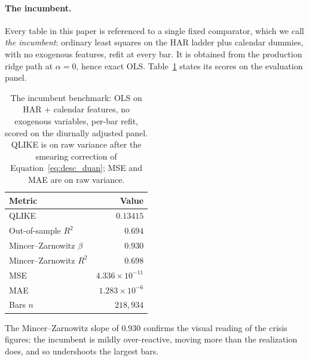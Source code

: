 \paragraph{The incumbent.}
Every table in this paper is referenced to a single fixed comparator, which we
call \emph{the incumbent}: ordinary least squares on the HAR ladder plus
calendar dummies, with no exogenous features, refit at every bar. It is obtained
from the production ridge path at $\alpha = 0$, hence exact OLS.
Table~\ref{tab:desc_incumbent} states its scores on the evaluation panel.

\begin{table}[H]
\centering
\caption{The incumbent benchmark: OLS on HAR $+$ calendar features, no exogenous
variables, per-bar refit, scored on the diurnally adjusted panel. QLIKE is on
raw variance after the smearing correction of
Equation~\eqref{eq:desc_duan}; MSE and MAE are on raw variance.}
\label{tab:desc_incumbent}
\begin{tabular}{lr}
\toprule
Metric & Value \\
\midrule
QLIKE                        & $0.13415$ \\
Out-of-sample $R^2$          & $0.694$ \\
Mincer--Zarnowitz $\beta$    & $0.930$ \\
Mincer--Zarnowitz $R^2$      & $0.698$ \\
MSE                          & $4.336\times 10^{-11}$ \\
MAE                          & $1.283\times 10^{-6}$ \\
Bars $n$                     & $218{,}934$ \\
\bottomrule
\end{tabular}
\end{table}

The Mincer--Zarnowitz slope of $0.930$ confirms the visual reading of the crisis
figures: the incumbent is mildly over-reactive, moving more than the realization
does, and so undershoots the largest bars.

